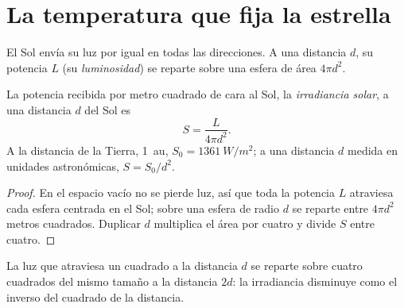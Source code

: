 \section{La temperatura que fija la estrella}

El Sol envía su luz por igual en todas las direcciones. A una distancia $d$,
su potencia $L$ (su \emph{luminosidad}) se reparte sobre una esfera de área
$4\pi d^2$.

\begin{proposition}\label{prop:g10:habitable-planet:inverse-square}
La potencia recibida por metro cuadrado de cara al Sol, la
\emph{irradiancia solar}, a una distancia $d$ del Sol es
\[
  S = \frac{L}{4\pi d^2}.
\]
A la distancia de la Tierra, \qty{1}{au}, $S_0 = \qty{1361}{W/m^2}$; a una
distancia $d$ medida en unidades astronómicas, $S = S_0/d^2$.
\end{proposition}

\begin{proof}
En el espacio vacío no se pierde luz, así que toda la potencia $L$ atraviesa
cada esfera centrada en el Sol; sobre una esfera de radio $d$ se reparte
entre $4\pi d^2$ metros cuadrados. Duplicar $d$ multiplica el área por cuatro
y divide $S$ entre cuatro.
\end{proof}

\begin{omfigure}

{\small La luz que atraviesa un cuadrado a la distancia $d$ se reparte sobre
cuatro cuadrados del mismo tamaño a la distancia $2d$: la irradiancia
disminuye como el inverso del cuadrado de la distancia.}
\end{omfigure}


